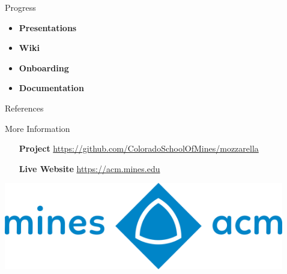\documentclass[final]{beamer}
\newlength{\sepwid}
\newlength{\onecolwid}
\begin{document}
\begin{frame}[t]
\begin{columns}[t]
\begin{column}{\onecolwid}
            \end{column} %

            \begin{column}{\sepwid}\end{column} %

            \begin{column}{\onecolwid} %

                \begin{block}{Progress}
                    \setlength{\parskip}{0.5em}

		    \begin{itemize}
			\item \textbf{Presentations}
			\item \textbf{Wiki}
			\item \textbf{Onboarding}
			\item \textbf{Documentation}
		    \end{itemize}

                \end{block}

                \begin{block}{References}
                    \printbibliography
                \end{block}


                \begin{alertblock}{More Information}

                    \begin{enumerate}[leftmargin=10.5cm, labelsep=1cm]

                        \item[\textbf{Project}]
                            \href{https://github.com/ColoradoSchoolOfMines/mozzarella}{\url{https://github.com/ColoradoSchoolOfMines/mozzarella}}

                        \item[\textbf{Live Website}]
			    \href{https://acm.mines.edu}{\url{https://acm.mines.edu}}
                    \end{enumerate}

                \end{alertblock}
		\includegraphics[width=.95\linewidth]{./full_2048.png}
            \end{column} %


\end{columns}
\end{frame}
\end{document}

